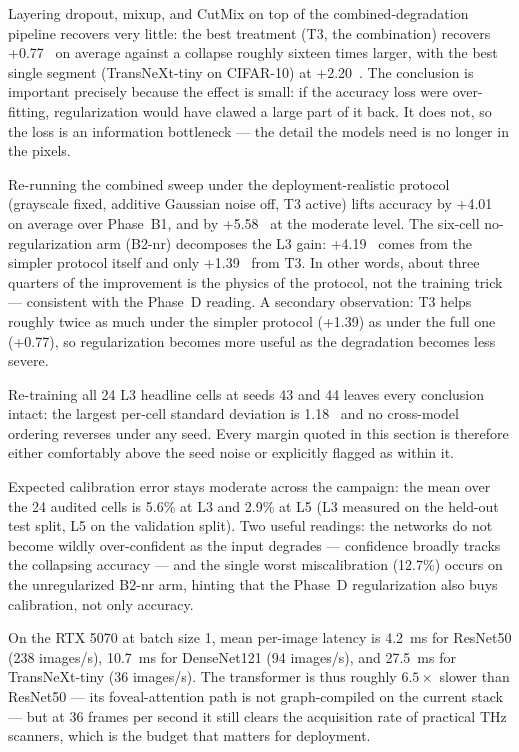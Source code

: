  Layering dropout,
mixup, and CutMix on top of the combined-degradation pipeline recovers very
little: the best treatment (T3, the combination) recovers +0.77~\Mpp{} on
average against a collapse roughly sixteen times larger, with the best single
segment (TransNeXt-tiny on CIFAR-10) at +2.20~\Mpp{}. The conclusion is
important precisely because the effect is small: if the accuracy loss were
over-fitting, regularization would have clawed a large part of it back. It
does not, so the loss is an information bottleneck --- the detail the models
need is no longer in the pixels.

Re-running the combined sweep under the deployment-realistic protocol
(grayscale fixed, additive Gaussian noise off, T3 active) lifts accuracy by
+4.01~\Mpp{} on average over Phase~B1, and by +5.58~\Mpp{} at the moderate
level. The six-cell no-regularization arm (B2-nr) decomposes the L3 gain:
+4.19~\Mpp{} comes from the simpler protocol itself and only +1.39~\Mpp{}
from T3. In other words, about three quarters of the improvement is the
physics of the protocol, not the training trick --- consistent with the
Phase~D reading. A secondary observation: T3 helps roughly twice as much
under the simpler protocol (+1.39) as under the full one (+0.77), so
regularization becomes more useful as the degradation becomes less severe.

 Re-training all 24 L3
headline cells at seeds 43 and 44 leaves every conclusion intact: the largest
per-cell standard deviation is 1.18~\Mpp{} and no cross-model ordering
reverses under any seed. Every margin quoted in this section is therefore
either comfortably above the seed noise or explicitly flagged as within it.

 Expected calibration error stays moderate across
the campaign: the mean over the 24 audited cells is 5.6\% at L3 and 2.9\% at
L5 (L3 measured on the held-out test split, L5 on the validation split).
Two useful readings: the networks do not become wildly over-confident as the
input degrades --- confidence broadly tracks the collapsing accuracy --- and
the single worst miscalibration (12.7\%) occurs on the unregularized B2-nr
arm, hinting that the Phase~D regularization also buys calibration, not only
accuracy.

 On the RTX 5070 at batch size 1, mean
per-image latency is 4.2~ms for ResNet50 (238 images/s), 10.7~ms for
DenseNet121 (94 images/s), and 27.5~ms for TransNeXt-tiny (36 images/s).
The transformer is thus roughly $6.5\times$ slower than ResNet50 --- its
foveal-attention path is not graph-compiled on the current stack --- but at
36 frames per second it still clears the acquisition rate of practical THz
scanners, which is the budget that matters for deployment.

